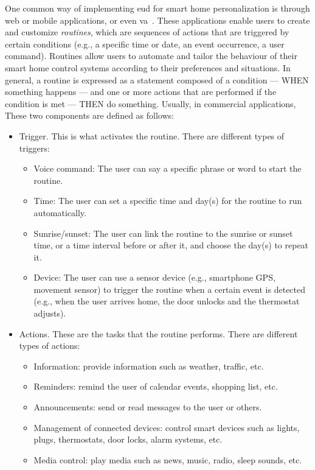 One common way of implementing \acrshort{eud} for smart home personalization is through web or mobile applications, or even \acrfull{va}~\parencite{barricelliVirtualAssistantsPersonalizing2021,arditoSmartObjectsSmart2018}. These applications enable users to create and customize \textit{routines}, which are sequences of actions that are triggered by certain conditions (e.g., a specific time or date, an event occurrence, a user command). Routines allow users to automate and tailor the behaviour of their smart home control systems according to their preferences and situations. In general, a routine is expressed as a statement composed of a condition --- WHEN something happens --- and one or more actions that are performed if the condition is met --- THEN do something. Usually, in commercial applications, These two components are defined as follows:
\begin{itemize}
    \item Trigger. This is what activates the routine. There are different types of triggers:
          \begin{itemize}
              \item Voice command: The user can say a specific phrase or word to start the routine.
              \item Time: The user can set a specific time and day(s) for the routine to run automatically.
              \item Sunrise/sunset: The user can link the routine to the sunrise or sunset time, or a time interval before or after it, and choose the day(s) to repeat it.
              \item Device: The user can use a sensor device (e.g., smartphone GPS, movement sensor) to trigger the routine when a certain event is detected (e.g., when the user arrives home, the door unlocks and the thermostat adjusts).
          \end{itemize}
    \item Actions. These are the tasks that the routine performs. There are different types of actions:
          \begin{itemize}
              \item Information: provide information such as weather, traffic, etc.
              \item Reminders: remind the user of calendar events, shopping list, etc.
              \item Announcements: send or read messages to the user or others.
              \item Management of connected devices: control smart devices such as lights, plugs, thermostats, door locks, alarm systems, etc.
              \item Media control: play media such as news, music, radio, sleep sounds, etc.
          \end{itemize}
\end{itemize}
